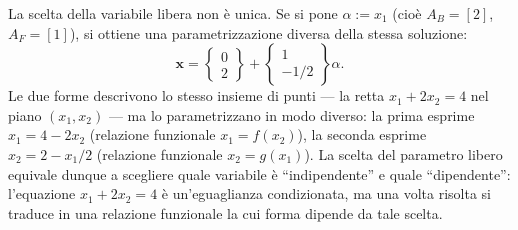 La scelta della variabile libera non \`e unica. Se si pone
$\alpha:=x_1$ (cio\`e $A_B=[2]$, $A_F=[1]$), si ottiene una
parametrizzazione diversa della stessa soluzione:
\begin{equation}
	\bm{x}
	= \begin{Bmatrix} 0 \\ 2 \end{Bmatrix}
	+ \begin{Bmatrix} 1 \\ -1/2 \end{Bmatrix} \alpha.
\end{equation}
Le due forme descrivono lo stesso insieme di punti --- la retta
$x_1 + 2x_2 = 4$ nel piano $(x_1,x_2)$ --- ma lo parametrizzano
in modo diverso: la prima esprime $x_1 = 4-2x_2$ (relazione
funzionale $x_1=f(x_2)$), la seconda esprime $x_2=2-x_1/2$
(relazione funzionale $x_2=g(x_1)$). La scelta del parametro
libero equivale dunque a scegliere quale variabile \`e
``indipendente'' e quale ``dipendente'': l'equazione
$x_1+2x_2=4$ \`e un'eguaglianza condizionata, ma una volta
risolta si traduce in una relazione funzionale la cui forma
dipende da tale scelta.

